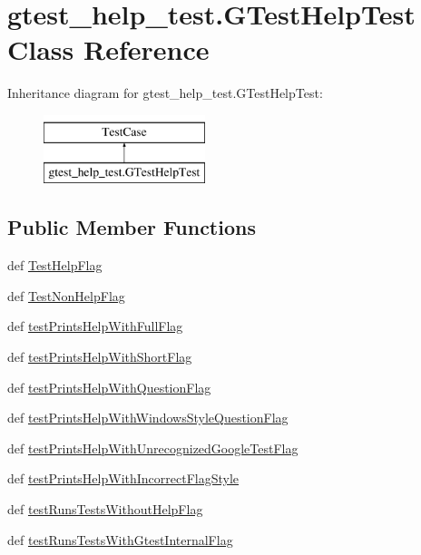 \hypertarget{classgtest__help__test_1_1_g_test_help_test}{\section{gtest\-\_\-help\-\_\-test.\-G\-Test\-Help\-Test Class Reference}
\label{classgtest__help__test_1_1_g_test_help_test}
}
Inheritance diagram for gtest\-\_\-help\-\_\-test.\-G\-Test\-Help\-Test\-:\begin{figure}[H]
\begin{center}
\leavevmode
\includegraphics[height=2.000000cm]{classgtest__help__test_1_1_g_test_help_test}
\end{center}
\end{figure}
\subsection*{Public Member Functions}
\begin{DoxyCompactItemize}
\item 
def \hyperlink{classgtest__help__test_1_1_g_test_help_test_a913bc1e0c66584e436623688ba4d6b50}{Test\-Help\-Flag}
\item 
def \hyperlink{classgtest__help__test_1_1_g_test_help_test_a0eb2fe97ba1d7e143d96c53f291b1483}{Test\-Non\-Help\-Flag}
\item 
def \hyperlink{classgtest__help__test_1_1_g_test_help_test_a99d9c22b2f109922c7f9801a893ac84b}{test\-Prints\-Help\-With\-Full\-Flag}
\item 
def \hyperlink{classgtest__help__test_1_1_g_test_help_test_abbbdca638eac1b6282575d829ddbfbb1}{test\-Prints\-Help\-With\-Short\-Flag}
\item 
def \hyperlink{classgtest__help__test_1_1_g_test_help_test_a4073fd2c07d116a27c292254530c19e5}{test\-Prints\-Help\-With\-Question\-Flag}
\item 
def \hyperlink{classgtest__help__test_1_1_g_test_help_test_a97d597972c6e922959ce2a52624ab1fe}{test\-Prints\-Help\-With\-Windows\-Style\-Question\-Flag}
\item 
def \hyperlink{classgtest__help__test_1_1_g_test_help_test_a997c51b045d9afdb780fba760dcc998b}{test\-Prints\-Help\-With\-Unrecognized\-Google\-Test\-Flag}
\item 
def \hyperlink{classgtest__help__test_1_1_g_test_help_test_a4bcda3b4198315aa02b8cbac95e24988}{test\-Prints\-Help\-With\-Incorrect\-Flag\-Style}
\item 
def \hyperlink{classgtest__help__test_1_1_g_test_help_test_a5a5285dac93bcc5933da13ed5209fbda}{test\-Runs\-Tests\-Without\-Help\-Flag}
\item 
def \hyperlink{classgtest__help__test_1_1_g_test_help_test_aabce3d2be94ad4e413b9452e3dc8c3a8}{test\-Runs\-Tests\-With\-Gtest\-Internal\-Flag}
\end{DoxyCompactItemize}


